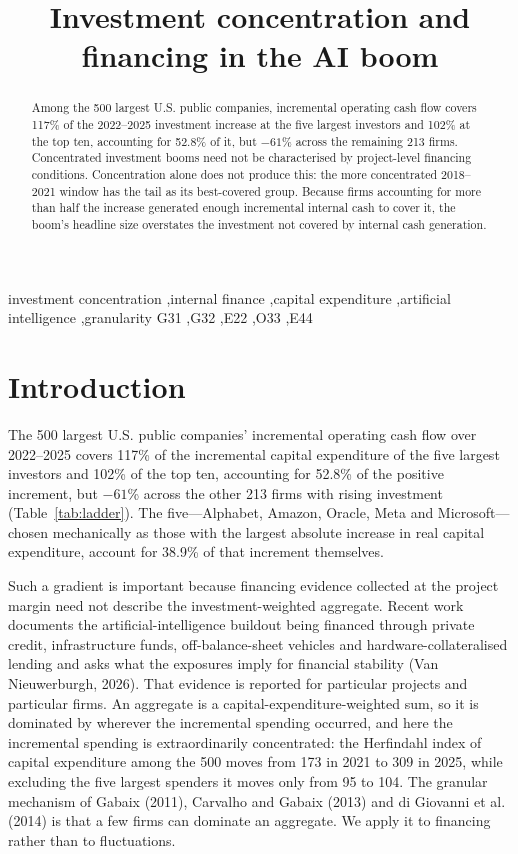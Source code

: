 \documentclass[preprint,11pt]{elsarticle}
\begin{document}
\begin{frontmatter}
\title{Investment concentration and financing in the AI boom}
\begin{abstract}
Among the 500 largest U.S. public companies, incremental operating cash flow covers 117\% of the
2022--2025 investment increase at the five largest investors and 102\% at the top ten, accounting
for 52.8\% of it, but $-61$\% across the remaining 213 firms. Concentrated investment booms need not
be characterised by project-level financing conditions. Concentration alone does not produce this:
the more concentrated 2018--2021 window has the tail as its best-covered group. Because firms
accounting for more than half the increase generated enough incremental internal cash to cover it,
the boom's headline size overstates the investment not covered by internal cash generation.
\end{abstract}
\begin{keyword}
investment concentration \sep internal finance \sep capital expenditure \sep artificial
intelligence \sep granularity
\JEL G31 \sep G32 \sep E22 \sep O33 \sep E44
\end{keyword}
\end{frontmatter}


\section{Introduction}
The 500 largest U.S. public companies' incremental operating cash flow over 2022--2025 covers 117\%
of the incremental capital expenditure of the five largest investors and 102\% of the top ten,
accounting for 52.8\% of the positive increment, but $-61$\% across the other 213 firms with rising
investment (Table~\ref{tab:ladder}). The five---Alphabet, Amazon, Oracle, Meta and
Microsoft---chosen mechanically as those with the largest absolute increase in real capital
expenditure, account for 38.9\% of that increment themselves.

Such a gradient is important because financing evidence collected at the project margin need not
describe the investment-weighted aggregate. Recent work documents the artificial-intelligence
buildout being financed through private credit, infrastructure funds, off-balance-sheet vehicles and
hardware-collateralised lending and asks what the exposures imply for financial stability (Van
Nieuwerburgh, 2026). That evidence is reported for particular projects and particular firms. An
aggregate is a capital-expenditure-weighted sum, so it is dominated by wherever the incremental
spending occurred, and here the incremental spending is extraordinarily concentrated: the Herfindahl
index of capital expenditure among the 500 moves from 173 in 2021 to 309 in 2025, while excluding
the five largest spenders it moves only from 95 to 104. The granular mechanism of Gabaix (2011),
Carvalho and Gabaix (2013) and di Giovanni et al. (2014) is that a few firms can dominate an
aggregate. We apply it to financing rather than to fluctuations.
\end{document}
